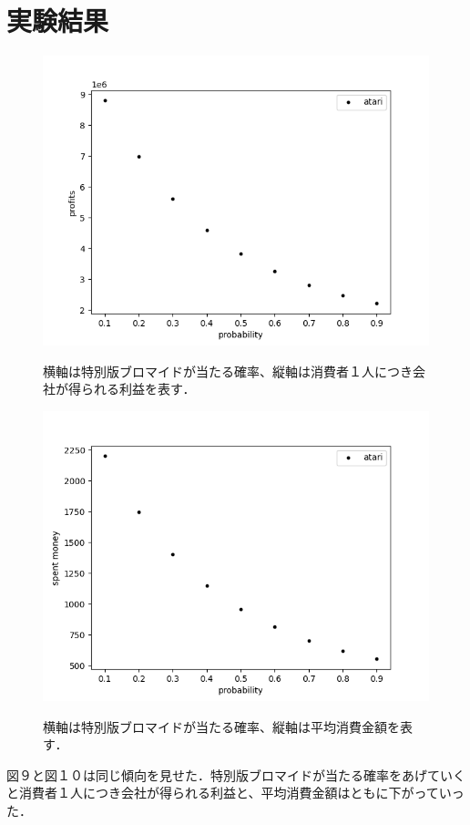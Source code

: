 \documentclass[fleqn, a4paper. 12pt]{ltjsarticle} %
\begin{document}
\section*{実験結果}
\begin{figure}[tb]
  \centering
  \includegraphics[width = \textwidth]{my_plot_3_A_profits.png}
  \label{f9}
  \caption{横軸は特別版ブロマイドが当たる確率、縦軸は消費者１人につき会社が得られる利益を表す．}
\end{figure}
\begin{figure}[tb]
  \centering
  \includegraphics[width = \textwidth]{my_plot_3_A_average.png}
  \label{f10}
  \caption{横軸は特別版ブロマイドが当たる確率、縦軸は平均消費金額を表す．}
\end{figure}
図９と図１０は同じ傾向を見せた．特別版ブロマイドが当たる確率をあげていくと消費者１人につき会社が得られる利益と、平均消費金額はともに下がっていった．
\end{document}

